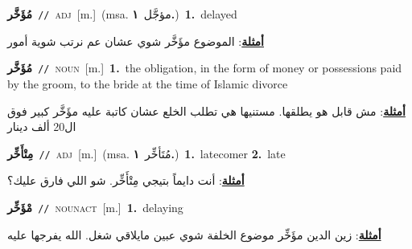 \documentclass[10pt,a4paper,twoside]{article} %
\begin{document}
\begin{multicols}{2}
{{{{{{{{{\setlength\topsep{0pt}\textbf{\foreignlanguage{arabic}{مُؤَخَّر}}\ {\color{gray}\texttt{//}\color{black}}\ \textsc{adj}\ [m.]\ \color{gray}(msa. \foreignlanguage{arabic}{مؤجَّل}~\foreignlanguage{arabic}{\textbf{١.}})\color{black}\ \textbf{1.}~delayed\  \begin{flushright}\color{gray}\foreignlanguage{arabic}{\textbf{\underline{\foreignlanguage{arabic}{أمثلة}}}: الموضوع مؤَخَّر شوي عشان عم نرتب شوية أمور}\end{flushright}\color{black}} \vspace{2mm}

{\setlength\topsep{0pt}\textbf{\foreignlanguage{arabic}{مُؤَخَّر}}\ {\color{gray}\texttt{//}\color{black}}\ \textsc{noun}\ [m.]\ \textbf{1.}~the obligation, in the form of money or possessions paid by the groom, to the bride at the time of Islamic divorce\  \begin{flushright}\color{gray}\foreignlanguage{arabic}{\textbf{\underline{\foreignlanguage{arabic}{أمثلة}}}: مش قابل هو يطلقها. مستنيها هي تطلب الخلع عشان كاتبة عليه مؤَخَّر كبير فوق ال20 ألف دينار}\end{flushright}\color{black}} \vspace{2mm}

{\setlength\topsep{0pt}\textbf{\foreignlanguage{arabic}{مِتْأَخِّر}}\ {\color{gray}\texttt{//}\color{black}}\ \textsc{adj}\ [m.]\ \color{gray}(msa. \foreignlanguage{arabic}{مُتَأخِّر}~\foreignlanguage{arabic}{\textbf{١.}})\color{black}\ \textbf{1.}~latecomer  \textbf{2.}~late\  \begin{flushright}\color{gray}\foreignlanguage{arabic}{\textbf{\underline{\foreignlanguage{arabic}{أمثلة}}}: أنت دايماً بتيجي مِتْأَخِّر. شو اللي فارق عليك؟}\end{flushright}\color{black}} \vspace{2mm}

{\setlength\topsep{0pt}\textbf{\foreignlanguage{arabic}{مْؤَخِّر}}\ {\color{gray}\texttt{//}\color{black}}\ \textsc{noun\textunderscore act}\ [m.]\ \textbf{1.}~delaying\  \begin{flushright}\color{gray}\foreignlanguage{arabic}{\textbf{\underline{\foreignlanguage{arabic}{أمثلة}}}: زين الدين مؤَخِّر موضوع الخلفة شوي عبين مايلاقي شغل. الله يفرجها عليه}\end{flushright}\color{black}} \vspace{2mm}

}}}}}}}}
\end{multicols}
\end{document}
